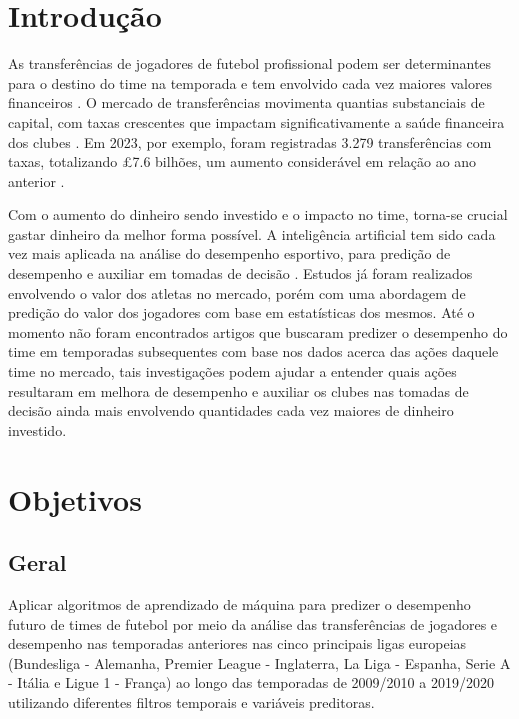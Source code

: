 \documentclass[a4paper]{article}
\theoremstyle{plain}
\theoremstyle{definition}
\begin{document}
\section{Introdução}
As transferências de jogadores de futebol profissional podem ser determinantes para o destino do time na temporada e tem envolvido cada vez maiores valores financeiros  \cite{ECA_TransferSystemEurope_2013}. O mercado de transferências movimenta quantias substanciais de capital, com taxas crescentes que impactam significativamente a saúde financeira dos clubes \cite{veliz_predicting_2025}. Em 2023, por exemplo, foram registradas 3.279 transferências com taxas, totalizando £7.6 bilhões, um aumento considerável em relação ao ano anterior \cite{fifa_global_transfer_2023}.

Com o aumento do dinheiro sendo investido e o impacto no time, torna-se crucial gastar dinheiro da melhor forma possível. A inteligência artificial tem sido cada vez mais aplicada na análise do desempenho esportivo, para predição de desempenho e auxiliar em tomadas de decisão \cite{claudino2019current}. Estudos já foram realizados envolvendo o valor dos atletas no mercado, porém com uma abordagem de predição do valor dos jogadores com base em estatísticas dos mesmos\cite{shen_predicting_2025}. Até o momento não foram encontrados artigos que buscaram predizer o desempenho do time em temporadas subsequentes com base nos dados acerca das ações daquele time no mercado, tais investigações podem ajudar a entender quais ações resultaram em melhora de desempenho e auxiliar os clubes nas tomadas de decisão ainda mais envolvendo quantidades cada vez maiores de dinheiro investido.



\section{Objetivos}
\subsection{Geral}
Aplicar algoritmos de aprendizado de máquina para predizer o desempenho futuro de times de futebol por meio da análise das transferências de jogadores e desempenho nas temporadas anteriores nas cinco principais ligas europeias (Bundesliga - Alemanha, Premier League - Inglaterra, La Liga - Espanha, Serie A - Itália e Ligue 1 - França) ao longo das temporadas de 2009/2010 a 2019/2020 utilizando diferentes filtros temporais e variáveis preditoras. 
\end{document}
